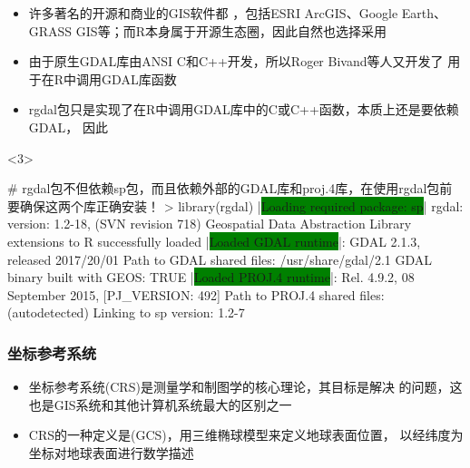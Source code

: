 \begin{frame}[t,fragile]{\subsecname}{\subsubsecname}
\begin{itemize}
\item<1-> 许多著名的开源和商业的GIS软件都
，包括ESRI ArcGIS、Google Earth、GRASS GIS等；而R本身属于开源生态圈，因此自然也选择采用
\item<2-> 由于原生GDAL库由ANSI C和C++开发，所以Roger Bivand等人又开发了
用于在R中调用GDAL库函数
\item<3-> rgdal包只是实现了在R中调用GDAL库中的C或C++函数，本质上还是要依赖GDAL，
因此
\end{itemize}

\begin{onlyenv}<3>
\begin{rcode}
# rgdal包不但依赖sp包，而且依赖外部的GDAL库和proj.4库，在使用rgdal包前要确保这两个库正确安装！
> library(rgdal)
|\colorbox{green}{Loading required package: sp}|
rgdal: version: 1.2-18, (SVN revision 718)
 Geospatial Data Abstraction Library extensions to R successfully loaded
 |\colorbox{green}{Loaded GDAL runtime}|: GDAL 2.1.3, released 2017/20/01
 Path to GDAL shared files: /usr/share/gdal/2.1
 GDAL binary built with GEOS: TRUE 
 |\colorbox{green}{Loaded PROJ.4 runtime}|: Rel. 4.9.2, 08 September 2015, [PJ_VERSION: 492]
 Path to PROJ.4 shared files: (autodetected)
 Linking to sp version: 1.2-7 
\end{rcode}
\end{onlyenv}
\end{frame}


\subsubsection{坐标参考系统}

\begin{frame}[t]{\subsecname}{\subsubsecname}
\begin{itemize}
\item<1->坐标参考系统(CRS)是测量学和制图学的核心理论，其目标是解决
的问题，这也是GIS系统和其他计算机系统最大的区别之一
\item<2-> CRS的一种定义是(GCS)，用三维椭球模型来定义地球表面位置，
以经纬度为坐标对地球表面进行数学描述
\end{itemize}

\begin{overlayarea}{\textwidth}{\textheight}
\end{overlayarea}
\end{frame}

